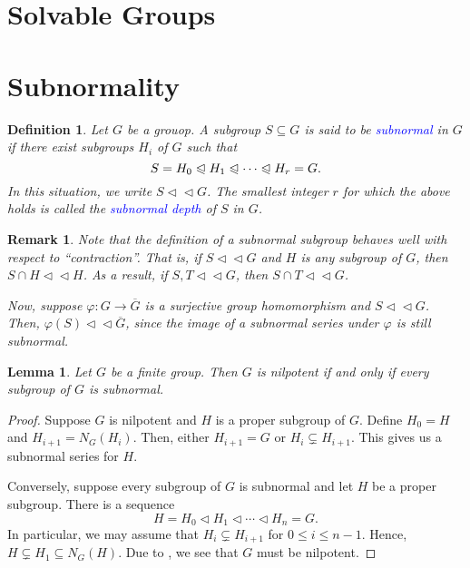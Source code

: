 \documentclass[12pt]{article}
\theoremstyle{thmstyle}
\newtheorem{lemma}[theorem]{Lemma}
\theoremstyle{defstyle}
\newtheorem{definition}[theorem]{Definition}
\newtheorem{remark}[theorem]{Remark}
\newcommand{\define}[1]{\textcolor{blue}{\textit{#1}}}
\renewcommand{\le}{\leqslant}
\newcommand{\nor}{\vartriangleleft}
\newcommand{\noreq}{\trianglelefteqslant}
\newcommand{\subnor}{\nor\!\nor}
\begin{document}
\section{Solvable Groups}


\section{Subnormality}

\begin{definition}
    Let $G$ be a grouop. A subgroup $S\subseteq G$ is said to be \define{subnormal} in $G$ if there exist subgroups $H_i$ of $G$ such that 
    \begin{equation*}
        S = H_0\noreq H_1\noreq\cdots\noreq H_r = G.
    \end{equation*}
    In this situation, we write $S\nor\nor G$. The smallest integer $r$ for which the above holds is called the \define{subnormal depth} of $S$ in $G$.
\end{definition}

\begin{remark}
    Note that the definition of a subnormal subgroup behaves well with respect to ``contraction''. That is, if $S\subnor G$ and $H$ is any subgroup of $G$, then $S\cap H\subnor H$. As a result, if $S, T\subnor G$, then $S\cap T\subnor G$.

    Now, suppose $\varphi: G\to\overline G$ is a surjective group homomorphism and $S\subnor G$. Then, $\varphi(S)\subnor\overline G$, since the image of a subnormal series under $\varphi$ is still subnormal.
\end{remark}

\begin{lemma}
    Let $G$ be a finite group. Then $G$ is nilpotent if and only if every subgroup of $G$ is subnormal.
\end{lemma}
\begin{proof}
    Suppose $G$ is nilpotent and $H$ is a proper subgroup of $G$. Define $H_0 = H$ and $H_{i + 1} = N_G(H_i)$. Then, either $H_{i + 1} = G$ or $H_i\subsetneq H_{i + 1}$. This gives us a subnormal series for $H$.

    Conversely, suppose every subgroup of $G$ is subnormal and let $H$ be a proper subgroup. There is a sequence 
    \begin{equation*}
        H = H_0\nor H_1\nor\cdots\nor H_n = G.
    \end{equation*}
    In particular, we may assume that $H_i\subsetneq H_{i + 1}$ for $0\le i\le n - 1$. Hence, $H\subsetneq H_1\subseteq N_G(H)$. Due to , we see that $G$ must be nilpotent.
\end{proof}
\end{document}
